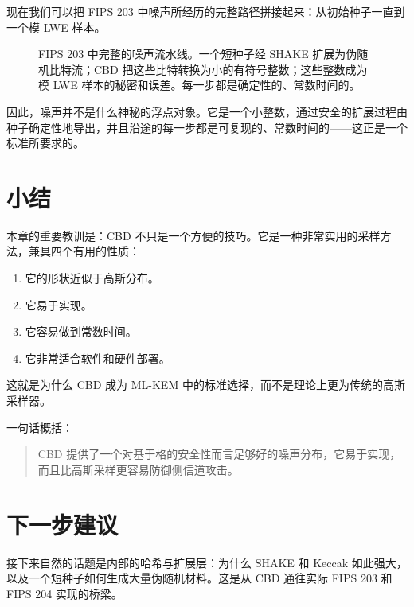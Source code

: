 现在我们可以把 FIPS 203 中噪声所经历的完整路径拼接起来：从初始种子一直到一个模 LWE 样本。

\begin{figure}[H]
\centering
{}
\caption{FIPS 203 中完整的噪声流水线。一个短种子经 SHAKE 扩展为伪随机比特流；CBD 把这些比特转换为小的有符号整数；这些整数成为模 LWE 样本的秘密和误差。每一步都是确定性的、常数时间的。}
\label{fig:cbd-pipeline}
\end{figure}

因此，噪声并不是什么神秘的浮点对象。它是一个小整数，通过安全的扩展过程由种子确定性地导出，并且沿途的每一步都是可复现的、常数时间的——这正是一个标准所要求的。

\section{小结}

本章的重要教训是：CBD 不只是一个方便的技巧。它是一种非常实用的采样方法，兼具四个有用的性质：

\begin{enumerate}
  \item 它的形状近似于高斯分布。
  \item 它易于实现。
  \item 它容易做到常数时间。
  \item 它非常适合软件和硬件部署。
\end{enumerate}

这就是为什么 CBD 成为 ML-KEM 中的标准选择，而不是理论上更为传统的高斯采样器。

一句话概括：

\begin{quote}
CBD 提供了一个对基于格的安全性而言足够好的噪声分布，它易于实现，而且比高斯采样更容易防御侧信道攻击。
\end{quote}

\section{下一步建议}

接下来自然的话题是内部的哈希与扩展层：为什么 SHAKE 和 Keccak 如此强大，以及一个短种子如何生成大量伪随机材料。这是从 CBD 通往实际 FIPS 203 和 FIPS 204 实现的桥梁。

\printbibliography[heading=chapterrefs]
